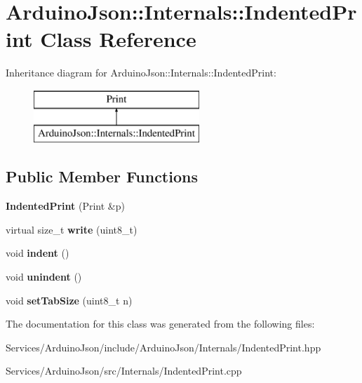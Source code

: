 \hypertarget{class_arduino_json_1_1_internals_1_1_indented_print}{}\section{Arduino\+Json\+:\+:Internals\+:\+:Indented\+Print Class Reference}
\label{class_arduino_json_1_1_internals_1_1_indented_print}
Inheritance diagram for Arduino\+Json\+:\+:Internals\+:\+:Indented\+Print\+:\begin{figure}[H]
\begin{center}
\leavevmode
\includegraphics[height=2.000000cm]{class_arduino_json_1_1_internals_1_1_indented_print}
\end{center}
\end{figure}
\subsection*{Public Member Functions}
\begin{DoxyCompactItemize}
\item 
\hypertarget{class_arduino_json_1_1_internals_1_1_indented_print_aa408b0c0bcb59f5f23dfba262ddca687}{}{\bfseries Indented\+Print} (Print \&p)\label{class_arduino_json_1_1_internals_1_1_indented_print_aa408b0c0bcb59f5f23dfba262ddca687}

\item 
\hypertarget{class_arduino_json_1_1_internals_1_1_indented_print_a93fda715afb45824a25c6df1b9bd77c1}{}virtual size\+\_\+t {\bfseries write} (uint8\+\_\+t)\label{class_arduino_json_1_1_internals_1_1_indented_print_a93fda715afb45824a25c6df1b9bd77c1}

\item 
\hypertarget{class_arduino_json_1_1_internals_1_1_indented_print_ab9530073fcda29015ecfdd5b93c884f3}{}void {\bfseries indent} ()\label{class_arduino_json_1_1_internals_1_1_indented_print_ab9530073fcda29015ecfdd5b93c884f3}

\item 
\hypertarget{class_arduino_json_1_1_internals_1_1_indented_print_aeb112bb656fbfef91bc2d9450b5b673b}{}void {\bfseries unindent} ()\label{class_arduino_json_1_1_internals_1_1_indented_print_aeb112bb656fbfef91bc2d9450b5b673b}

\item 
\hypertarget{class_arduino_json_1_1_internals_1_1_indented_print_aaed75d4165b3cc46619a893de252c486}{}void {\bfseries set\+Tab\+Size} (uint8\+\_\+t n)\label{class_arduino_json_1_1_internals_1_1_indented_print_aaed75d4165b3cc46619a893de252c486}

\end{DoxyCompactItemize}


The documentation for this class was generated from the following files\+:\begin{DoxyCompactItemize}
\item 
Services/\+Arduino\+Json/include/\+Arduino\+Json/\+Internals/Indented\+Print.\+hpp\item 
Services/\+Arduino\+Json/src/\+Internals/Indented\+Print.\+cpp\end{DoxyCompactItemize}
